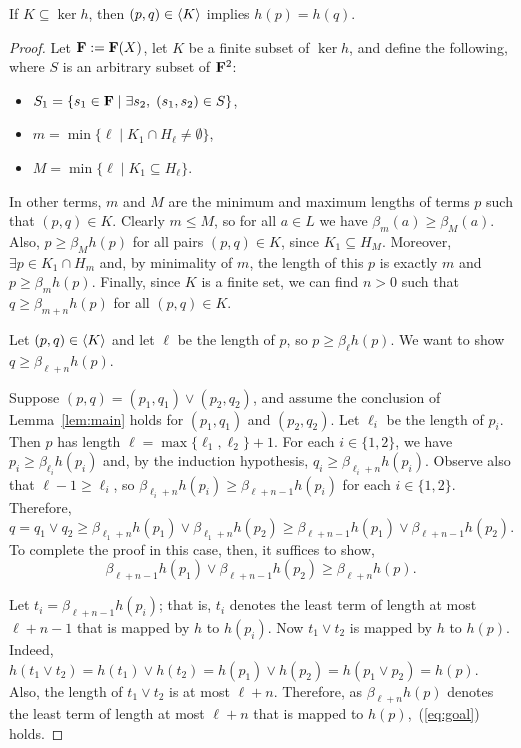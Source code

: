\begin{remark}
If $K \subseteq \ker h$, then $(p,q) \in \langle K\rangle$ implies $h(p) = h(q)$. 
\end{remark}
  
\begin{proof}
Let $\mathbf{F} := \mathbf{F}(X)$, let $K$ be a finite subset of $\ker h$, and
define the following, where $S$ is an arbitrary subset of $\mathbf{F}^2$:
 \begin{itemize}
\item $S_1 = \{s_1 \in \mathbf{F} \mid \exists s_2, \; (s_1,s_2) \in S \}$,
\item $m = \min \{\ell \mid K_1 \cap H_\ell \neq \emptyset\}$,
\item $M = \min \{\ell \mid K_1 \subseteq H_\ell\}$.
\end{itemize}
In other terms, $m$ and $M$ are the minimum and maximum lengths of 
terms $p$ such that $(p,q) \in K$.
Clearly $m\leq M$, so for all $a\in L$ we have $\beta_m(a) \geq \beta_M(a)$. 
Also, $p\geq \beta_M h(p)$ for all pairs $(p, q)\in K$, since $K_1 \subseteq H_M$.
Moreover, $\exists p \in K_1 \cap H_m$ and, by minimality of $m$, the length of 
this $p$ is exactly $m$ and $p \geq \beta_{m} h(p)$.
Finally, since $K$ is a finite set, we can find $n>0$ such that 
$q \geq \beta_{m+n} h(p)$ for all $(p, q) \in K$.

Let $(p,q) \in \langle K\rangle$ and let $\ell$ be the length of $p$, so 
$p\geq \beta_{\ell}h(p)$.  We want to show $q \geq \beta_{\ell + n}h(p)$.

 Suppose $(p, q) = (p_1, q_1) \vee (p_2, q_2)$,
and assume the conclusion of Lemma~\ref{lem:main} holds for 
$(p_1, q_1)$ and $(p_2, q_2)$.
Let $\ell_i$ be the length of $p_i$.  Then $p$ has length 
$\ell = \max\{\ell_1, \ell_2\} + 1$. For each $i\in \{1,2\}$,
we have $p_i\geq \beta_{\ell_i}h(p_i)$ and, by the induction hypothesis,
$q_i\geq \beta_{\ell_i+n}h(p_i)$.  Observe also that 
$\ell -1 \geq \ell_i$, so 
$\beta_{\ell_i+n}h(p_i) \geq \beta_{\ell+n-1}h(p_i)$ for each $i\in \{1,2\}$.
Therefore, 
\[
q = q_1\vee q_2\geq \beta_{\ell_1+n}h(p_1) \vee \beta_{\ell_1+n}h(p_2)
\geq \beta_{\ell+n-1}h(p_1) \vee \beta_{\ell+n-1}h(p_2).
\]
To complete the proof in this case, then, it suffices to show,
\begin{equation}
\label{eq:goal}  
\beta_{\ell+n-1}h(p_1) \vee \beta_{\ell+n-1}h(p_2) \geq 
\beta_{\ell+n}h(p).
\end{equation}

Let $t_i = \beta_{\ell+n-1}h(p_i)$; that is, $t_i$ denotes the
least term of length at most 
$\ell + n -1$ that is mapped by $h$ to $h(p_i)$.
Now $t_1 \vee t_2$ is mapped by $h$ to $h(p)$. Indeed,
$h(t_1\vee t_2) = h(t_1)\vee h(t_2) = h(p_1)\vee h(p_2) = h(p_1\vee p_2) = 
h(p)$. Also, the length of $t_1 \vee t_2$ is at most $\ell +n$.
Therefore, as $\beta_{\ell+n}h(p)$ denotes the least term of length at most
$\ell +n$ that is mapped to $h(p)$,~(\ref{eq:goal}) holds.


\end{proof}
